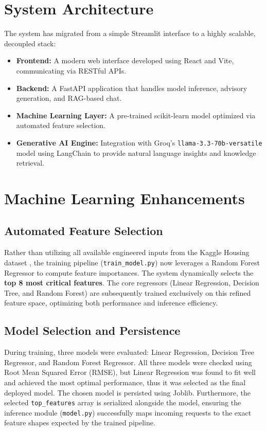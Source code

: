 \documentclass[conference]{IEEEtran}
\begin{document}
\section{System Architecture}
The system has migrated from a simple Streamlit interface to a highly scalable, decoupled stack:
\begin{itemize}
    \item \textbf{Frontend:} A modern web interface developed using React \cite{react} and Vite, communicating via RESTful APIs.
    \item \textbf{Backend:} A FastAPI \cite{fastapi} application that handles model inference, advisory generation, and RAG-based chat.
    \item \textbf{Machine Learning Layer:} A pre-trained scikit-learn \cite{sklearn} model optimized via automated feature selection.
    \item \textbf{Generative AI Engine:} Integration with Groq's \texttt{llama-3.3-70b-versatile} \cite{groq_llama} model using LangChain \cite{langchain} to provide natural language insights and knowledge retrieval.
\end{itemize}

\section{Machine Learning Enhancements}
\subsection{Automated Feature Selection}
Rather than utilizing all available engineered inputs from the Kaggle Housing dataset \cite{kaggle_housing}, the training pipeline (\texttt{train\_model.py}) now leverages a Random Forest Regressor \cite{breiman2001} to compute feature importances. The system dynamically selects the \textbf{top 8 most critical features}. The core regressors (Linear Regression, Decision Tree, and Random Forest) are subsequently trained exclusively on this refined feature space, optimizing both performance and inference efficiency.

\subsection{Model Selection and Persistence}
During training, three models were evaluated: Linear Regression, Decision Tree Regressor, and Random Forest Regressor. All three models were checked using Root Mean Squared Error (RMSE), but Linear Regression was found to fit well and achieved the most optimal performance, thus it was selected as the final deployed model. The chosen model is persisted using Joblib. Furthermore, the selected \texttt{top\_features} array is serialized alongside the model, ensuring the inference module (\texttt{model.py}) successfully maps incoming requests to the exact feature shapes expected by the trained pipeline.
\end{document}
